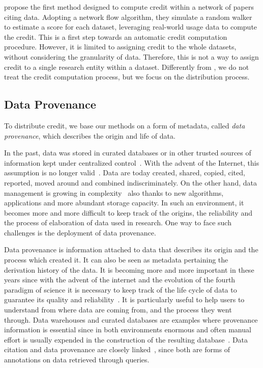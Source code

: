 \citep{zeng2020assigning} propose the first method designed to compute credit within a network of papers citing data. 
Adopting a network flow algorithm, they simulate a random walker to estimate a score for each dataset, leveraging real-world usage data to compute the credit.
This is a first step towards an automatic credit computation procedure.
However, it is limited to assigning credit to the whole datasets, without considering the granularity of data. Therefore, this is not a way to assign credit to a single research entity within a dataset. 
Differently from \citep{zeng2020assigning}, we do not treat the credit computation process, but we focus on the distribution process.

\subsection{Data Provenance}
\label{section:related_provenance}

To distribute credit, we base our methods on a form of metadata, called \emph{data provenance}, which describes the origin and life of data. 

In the past, data was stored in curated databases or in other trusted sources of information kept under centralized control~\citep{CheneyProvSurvey}. 
With the advent of the Internet, this assumption is no longer valid~\citep{lynch2001documents}. Data are today created, shared, copied, cited, reported, moved around and combined indiscriminately.
On the other hand, data management is growing in complexity~\citep{SimmhanPG05} also thanks to new algorithms, applications and more abundant storage capacity.
In such an environment, it becomes more and more difficult to keep track of the origins, the reliability and the process of elaboration of data used in research.
One way to face such challenges is the deployment of data provenance. 

Data provenance is information attached to data that describes its origin and the process which created it. It can also be seen as metadata pertaining the derivation history of the data. 
It is becoming more and more important in these years since with the advent of the internet and the evolution of the fourth paradigm of science it is necessary to keep track of the life cycle of data to guarantee its quality and reliability~\citep{SimmhanPG05, CheneyProvSurvey}. 
 It is particularly useful to help users to understand from where data are coming from, and the process they went through. 
 Data warehouses and curated databases are examples where provenance information is essential since in both environments enormous and often manual effort is usually expended in the construction of the resulting database~\citep{CheneyProvSurvey}. 
 Data citation and data provenance are closely linked~\citep{AlawiniDSTW17}, since both are forms of annotations on data retrieved through queries. 

